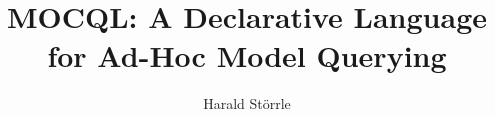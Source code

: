 
  \title{MOCQL: A Declarative Language for Ad-Hoc Model Querying}

  \author{Harald St\"orrle}

  
\maketitle
\clearpage
\setcounter{page}{18}